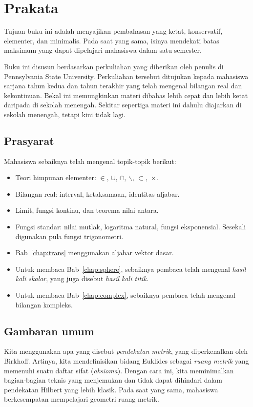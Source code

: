 \chapter*{Prakata}

Tujuan buku ini adalah menyajikan pembahasan yang
ketat,
konservatif,
elementer,
dan minimalis.
Pada saat yang sama, isinya mendekati batas maksimum yang dapat dipelajari mahasiswa dalam satu semester.

Buku ini disusun berdasarkan
perkuliahan yang diberikan oleh penulis
di Pennsylvania State University.
Perkuliahan tersebut ditujukan kepada mahasiswa sarjana tahun kedua dan tahun terakhir yang telah mengenal bilangan real dan kekontinuan.
Bekal ini memungkinkan materi dibahas lebih cepat dan lebih ketat daripada di sekolah menengah.
Sekitar sepertiga materi ini dahulu diajarkan di sekolah menengah, tetapi kini tidak lagi.

\section{Prasyarat}

Mahasiswa sebaiknya telah mengenal
topik-topik berikut:
\begin{itemize}
\item Teori himpunan elementer:
$\in$,
$\cup$, 
$\cap$,
$\backslash$,
$\subset$,~$\times$.
\item Bilangan real: interval, ketaksamaan, identitas aljabar.
\item Limit, fungsi kontinu, dan teorema nilai antara.
\item Fungsi standar:
nilai mutlak,
logaritma natural,
fungsi eksponensial.
Sesekali digunakan pula fungsi trigonometri.
\item Bab~\ref{chap:trans} menggunakan aljabar vektor dasar.
\item Untuk membaca Bab~\ref{chap:sphere}, sebaiknya pembaca telah mengenal \textit{hasil kali skalar}, yang juga disebut \textit{hasil kali titik}.
\item Untuk membaca Bab~\ref{chap:complex}, sebaiknya pembaca telah mengenal bilangan kompleks.
\end{itemize} 

\section{Gambaran umum}

Kita menggunakan apa yang disebut \textit{pendekatan metrik}, yang diperkenalkan oleh Birkhoff.
Artinya, kita mendefinisikan bidang Euklides sebagai \textit{ruang metrik} yang memenuhi suatu daftar sifat (\textit{aksioma}).
Dengan cara ini, kita meminimalkan bagian-bagian teknis yang menjemukan
dan tidak dapat dihindari dalam pendekatan Hilbert yang lebih klasik.
Pada saat yang sama, mahasiswa berkesempatan mempelajari geometri ruang metrik.

